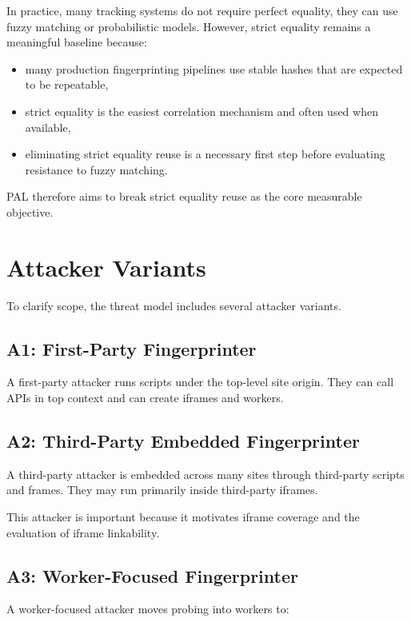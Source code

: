 \documentclass[11pt]{report}
\begin{document}
In practice, many tracking systems do not require perfect equality, they can use fuzzy matching or probabilistic models. However, strict equality remains a meaningful baseline because:

\begin{itemize}
    \item many production fingerprinting pipelines use stable hashes that are expected to be repeatable,
    \item strict equality is the easiest correlation mechanism and often used when available,
    \item eliminating strict equality reuse is a necessary first step before evaluating resistance to fuzzy matching.
\end{itemize}

PAL therefore aims to break strict equality reuse as the core measurable objective.

\section{Attacker Variants}

To clarify scope, the threat model includes several attacker variants.

\subsection{A1: First-Party Fingerprinter}

A first-party attacker runs scripts under the top-level site origin. They can call APIs in top context and can create iframes and workers.

\subsection{A2: Third-Party Embedded Fingerprinter}

A third-party attacker is embedded across many sites through third-party scripts and frames. They may run primarily inside third-party iframes.

This attacker is important because it motivates iframe coverage and the evaluation of iframe linkability.

\subsection{A3: Worker-Focused Fingerprinter}

A worker-focused attacker moves probing into workers to:
\end{document}
